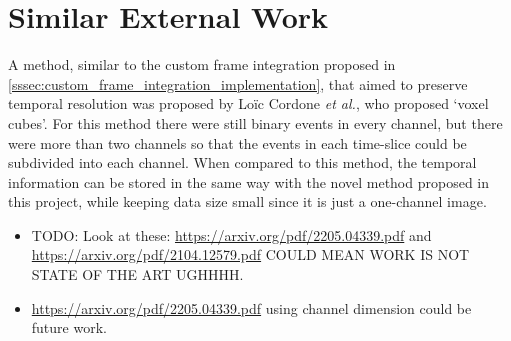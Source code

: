 \section{Similar External Work}

A method, similar to the custom frame integration proposed in \cref{sssec:custom_frame_integration_implementation}, that aimed to preserve temporal resolution was proposed by Lo\"ic Cordone \textit{et al.}, who proposed `voxel cubes'\cite{MiniVovelCubes}. For this method there were still binary events in every channel, but there were more than two channels so that the events in each time-slice could be subdivided into each channel. When compared to this method, the temporal information can be stored in the same way with the novel method proposed in this project, while keeping data size small since it is just a one-channel image. 

\color{red}
\begin{itemize}
    \item TODO: Look at these: \url{https://arxiv.org/pdf/2205.04339.pdf} and \url{https://arxiv.org/pdf/2104.12579.pdf} COULD MEAN WORK IS NOT STATE OF THE ART UGHHHH. 
    \item \url{https://arxiv.org/pdf/2205.04339.pdf} using channel dimension could be future work.
\end{itemize}
\color{black}
